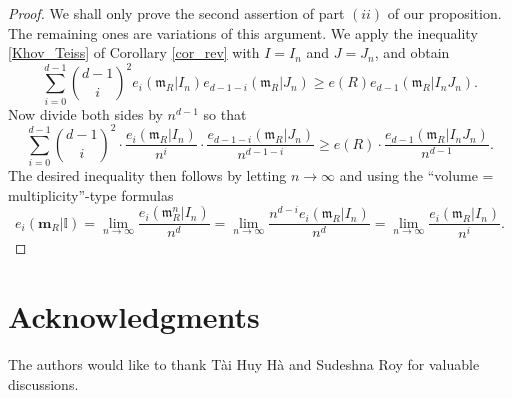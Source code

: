 \documentclass[12pt,a4paper]{amsart}
\theoremstyle{plain}
\theoremstyle{definition}
\numberwithin{equation}{theorem}
\begin{document}
\begin{proof}
We shall only prove the second assertion of part $(ii)$ of our proposition. The remaining ones are variations of this argument. We apply the inequality \eqref{Khov_Teiss} of Corollary \ref{cor_rev} with $I=I_n$ and $J=J_n$, and obtain
$$\sum_{i=0}^{d-1} {\binom{d-1}{i}}^2 e_{i}\left(\mathfrak{m}_R \vert I_n\right) e_{d-1-i}\left(\mathfrak{m}_R \vert J_n\right) \geq e(R) e_{d-1}\left(\mathfrak{m}_R \vert I_nJ_n\right).$$
Now divide both sides by $n^{d-1}$ so that
$$\sum_{i=0}^{d-1} {\binom{d-1}{i}}^2 \cdot \dfrac{e_{i}\left(\mathfrak{m}_R \vert I_n\right)}{n^i}\cdot \dfrac{e_{d-1-i}\left(\mathfrak{m}_R \vert J_n\right)}{n^{d-1-i}} \geq e(R)\cdot \dfrac{e_{d-1}\left(\mathfrak{m}_R \vert I_nJ_n\right)}{n^{d-1}}.$$
The desired inequality then follows by letting $n\to\infty$ and using the ``volume = multiplicity''-type formulas
$$e_i(\mathbf{m}_R \vert \mathbb{I}) = \lim_{n\to\infty}\dfrac{e_i(\mathfrak{m}_R^n \vert I_n)}{n^d} = \lim_{n\to\infty}\dfrac{n^{d-i}e_i(\mathfrak{m}_R \vert I_n)}{n^d} = \lim_{n\to\infty}\dfrac{e_i(\mathfrak{m}_R \vert I_n)}{n^i}.$$
\end{proof}

\section{Acknowledgments}

The authors would like to thank T\`{a}i Huy H\`{a} and Sudeshna Roy for valuable discussions.



\end{document}
